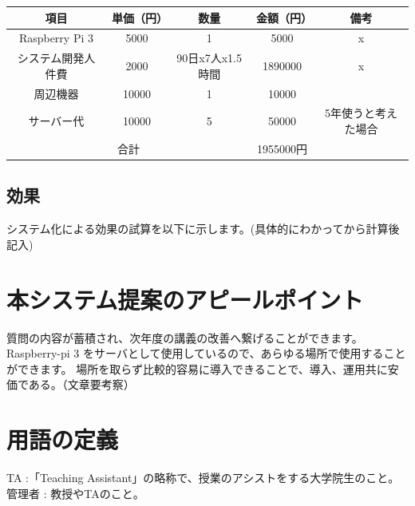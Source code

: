 \documentclass[a4j,titlepage]{ujarticle}
\begin{document}
\begin{table}[htb]
  \begin{tabular}{|c|c|c|c|c|} \hline
    項目 & 単価（円） & 数量 & 金額（円） & 備考 \\ \hline
     Raspberry Pi 3&  5000&  1&  5000& x \\ \hline
     システム開発人件費&  2000& 90日x7人x1.5時間&1890000&x  \\ \hline
     周辺機器&  10000&  1&  10000&  \\ \hline
      サーバー代&  10000&  5&  50000&5年使うと考えた場合  \\ \hline
    \multicolumn{3}{c||}{合計}& 1955000円 &  \\ \hline
  \end{tabular}
\end{table}

\subsection{効果}
システム化による効果の試算を以下に示します。(具体的にわかってから計算後記入)

\section{本システム提案のアピールポイント}
質問の内容が蓄積され、次年度の講義の改善へ繋げることができます。
Raspberry-pi 3 をサーバとして使用しているので、あらゆる場所で使用することができます。
場所を取らず比較的容易に導入できることで、導入、運用共に安価である。（文章要考察）

\section{用語の定義}
TA :「Teaching Assistant」の略称で、授業のアシストをする大学院生のこと。
管理者 : 教授やTAのこと。




\newpage
\end{document}
